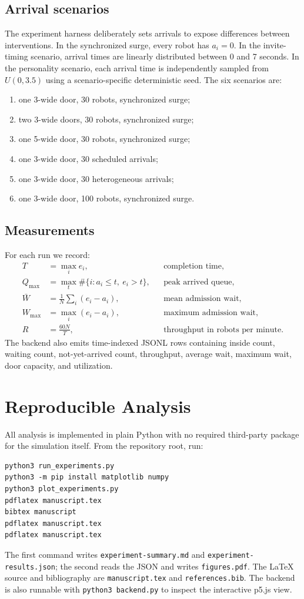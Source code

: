 \documentclass[11pt]{article}
\newcommand{\code}[1]{\texttt{#1}}
\begin{document}
\subsection{Arrival scenarios}
The experiment harness deliberately sets arrivals to expose differences between interventions. In the synchronized surge, every robot has $a_i=0$. In the invite-timing scenario, arrival times are linearly distributed between 0 and 7 seconds. In the personality scenario, each arrival time is independently sampled from $U(0,3.5)$ using a scenario-specific deterministic seed. The six scenarios are:
\begin{enumerate}[leftmargin=*]
\item one 3-wide door, 30 robots, synchronized surge;
\item two 3-wide doors, 30 robots, synchronized surge;
\item one 5-wide door, 30 robots, synchronized surge;
\item one 3-wide door, 30 scheduled arrivals;
\item one 3-wide door, 30 heterogeneous arrivals;
\item one 3-wide door, 100 robots, synchronized surge.
\end{enumerate}

\subsection{Measurements}
For each run we record:
\begin{align}
 T &= \max_i e_i, && \text{completion time},\\
 Q_{\max} &= \max_t \#\{i:a_i\leq t,\ e_i>t\}, && \text{peak arrived queue},\\
 \bar W &= \frac{1}{N}\sum_i(e_i-a_i), && \text{mean admission wait},\\
 W_{\max} &= \max_i(e_i-a_i), && \text{maximum admission wait},\\
 R &= \frac{60N}{T}, && \text{throughput in robots per minute}.
\end{align}
The backend also emits time-indexed JSONL rows containing inside count, waiting count, not-yet-arrived count, throughput, average wait, maximum wait, door capacity, and utilization.

\section{Reproducible Analysis}
All analysis is implemented in plain Python with no required third-party package for the simulation itself. From the repository root, run:
\begin{verbatim}
python3 run_experiments.py
python3 -m pip install matplotlib numpy
python3 plot_experiments.py
pdflatex manuscript.tex
bibtex manuscript
pdflatex manuscript.tex
pdflatex manuscript.tex
\end{verbatim}
The first command writes \code{experiment-summary.md} and \code{experiment-results.json}; the second reads the JSON and writes \code{figures.pdf}. The LaTeX source and bibliography are \code{manuscript.tex} and \code{references.bib}. The backend is also runnable with \code{python3 backend.py} to inspect the interactive p5.js view.
\end{document}
